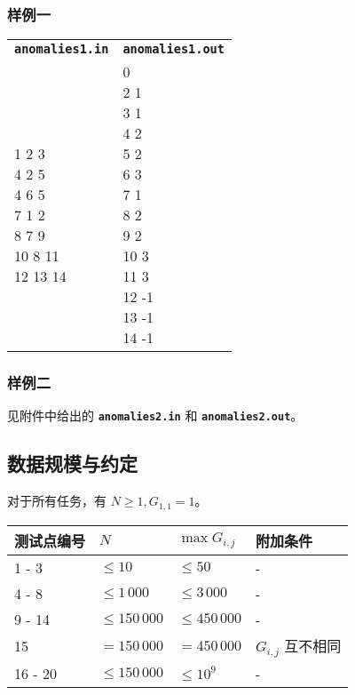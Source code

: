 \documentclass[UTF8, 11pt, a4paper]{article}
\begin{document}
\subsubsection*{样例一}
\begin{table}[h]\centering
\begin{tabularx}{0.8 \textwidth}{|X|X|}
\hline
\texttt{\textbf{anomalies1.in}} & \texttt{\textbf{anomalies1.out}} \\ \hline
{\ttfamily
7\newline
1 2 3\newline
4 2 5\newline
4 6 5\newline
7 1 2\newline
8 7 9\newline
10 8 11\newline
12 13 14
} & {\ttfamily
1 0\newline
2 1\newline
3 1\newline
4 2\newline
5 2\newline
6 3\newline
7 1\newline
8 2\newline
9 2\newline
10 3\newline
11 3\newline
12 -1\newline
13 -1\newline
14 -1
}
\\ \hline
\end{tabularx}\end{table}

\subsubsection*{样例二}
见附件中给出的 \texttt{\textbf{anomalies2.in}} 和 \texttt{\textbf{anomalies2.out}}。

\subsection*{数据规模与约定}
对于所有任务，有 $N \geq 1, G_{1, 1} = 1$。

\begin{table}[h]\centering
\begin{tabularx}{0.85 \textwidth}{X|X|X|X} \hline
测试点编号 & $N$             & $\max{G_{i,j}}$ & 附加条件 \\ \hline\hline
1 - 3      & $\leq 10$       & $\leq 50$       & - \\ \hline
4 - 8      & $\leq 1\,000$   & $\leq 3\,000$   & - \\ \hline
9 - 14     & $\leq 150\,000$ & $\leq 450\,000$ & - \\ \hline
15         & $= 150\,000$    & $= 450\,000$    & $G_{i,j}$ 互不相同 \\ \hline
16 - 20    & $\leq 150\,000$ & $\leq 10^9$     & - \\ \hline
\end{tabularx}
\end{table}
\end{document}

